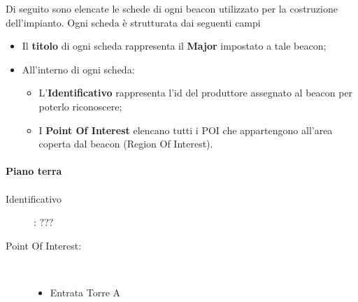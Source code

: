 \documentclass[../SperimentazioniPratiche.tex]{subfiles}
\begin{document}
		
		Di seguito sono elencate le schede di ogni beacon utilizzato per la costruzione dell'impianto. Ogni scheda è strutturata dai seguenti campi
		\begin{itemize}
			\item Il \textbf{titolo} di ogni scheda rappresenta il \textbf{Major} impostato a tale beacon;
			\item All'interno di ogni scheda:
			\begin{itemize}
				\item L'\textbf{Identificativo} rappresenta l'id del produttore assegnato al beacon per poterlo riconoscere;
				\item I \textbf{Point Of Interest} elencano tutti i POI che appartengono all'area coperta dal beacon (Region Of Interest).
			\end{itemize}
		\end{itemize}
		
		\newpage
		\paragraph{Piano terra}		
		
			\paragraph*{}
			\label{00000}
			\begin{tcolorbox}[fonttitle=\bfseries, 
								adjusted title={\Large Beacon 00000},
								sharp corners=south,
								colback=white, 
								colframe=white!50!blue!75!black]
								
				\begin{description}%
					\item[Identificativo]: ???

					\tcbline					
					
					\item[Point Of Interest:] \ \par
					\begin{itemize}
						\item Entrata Torre A
					\end{itemize}					   				
				\end{description}  				
			\end{tcolorbox}
			
\end{document}
